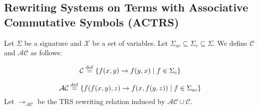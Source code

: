 \subsection{Rewriting Systems on Terms with Associative Commutative Symbols (ACTRS)}







 
\begin{definition}
  \label{def:trs:ac}
  Let $\Sigma$ be a signature and $\mathcal{X}$ be a set of variables.
  Let $\Sigma_{ac} \subseteq \Sigma_{c} \subseteq \Sigma$. We define $\mathcal{C}$ and $\mathcal{AC}$ as follows:
  
  $$\mathcal{C} \overset{\operatorname{def}}{=} \{f(x,y) \to f(y,x) \mid f \in \Sigma_{c} \}$$
  
  $$\mathcal{AC} \overset{\operatorname{def}}{=} 
           \{f(f(x,y),z) \to f(x,f(y,z)) \mid f \in \Sigma_{ac} \}$$
  Let $ \to_\mathcal{AC}$ be the TRS rewriting relation induced by $\mathcal{AC} \cup \mathcal{C}$.
\end{definition}

